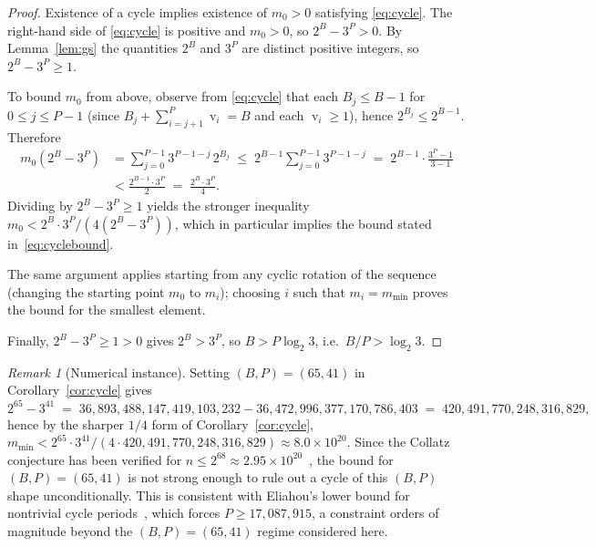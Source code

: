 \documentclass[11pt,a4paper]{article}
\theoremstyle{definition}
\theoremstyle{remark}
\newtheorem{remark}[theorem]{Remark}
\DeclareMathOperator{\val}{v}
\begin{document}
\begin{proof}
Existence of a cycle implies existence of $m_0 > 0$ satisfying
\eqref{eq:cycle}.  The right-hand side of \eqref{eq:cycle} is positive
and $m_0 > 0$, so $2^B - 3^P > 0$.  By Lemma~\ref{lem:gs} the
quantities $2^B$ and $3^P$ are distinct positive integers, so
$2^B - 3^P \geq 1$.

To bound $m_0$ from above, observe from \eqref{eq:cycle} that
each $B_j \leq B - 1$ for $0 \leq j \leq P - 1$ (since
$B_j + \sum_{i=j+1}^{P} \val_i = B$ and each $\val_i \geq 1$), hence
$2^{B_j} \leq 2^{B-1}$.  Therefore
\begin{align*}
  m_0 (2^B - 3^P)
  &= \sum_{j=0}^{P-1} 3^{P-1-j} \, 2^{B_j}
  \;\leq\; 2^{B-1} \sum_{j=0}^{P-1} 3^{P-1-j}
  \;=\; 2^{B-1} \cdot \frac{3^P - 1}{3 - 1} \\
  &< \frac{2^{B-1} \cdot 3^P}{2}
   \;=\; \frac{2^B \cdot 3^P}{4}.
\end{align*}
Dividing by $2^B - 3^P \geq 1$ yields the stronger inequality
$m_0 < 2^B \cdot 3^P / (4(2^B - 3^P))$, which in particular implies
the bound stated in~\eqref{eq:cyclebound}.

The same argument applies starting from any cyclic rotation of the
sequence (changing the starting point $m_0$ to $m_i$); choosing
$i$ such that $m_i = m_{\min}$ proves the bound for the smallest
element.

Finally, $2^B - 3^P \geq 1 > 0$ gives $2^B > 3^P$, so
$B > P \log_2 3$, i.e.\ $B/P > \log_2 3$.
\end{proof}

\begin{remark}[Numerical instance]\label{rem:cyclenum}
Setting $(B, P) = (65, 41)$ in Corollary~\ref{cor:cycle} gives
\[
  2^{65} - 3^{41}
  \;=\; 36{,}893{,}488{,}147{,}419{,}103{,}232
      - 36{,}472{,}996{,}377{,}170{,}786{,}403
  \;=\; 420{,}491{,}770{,}248{,}316{,}829,
\]
hence by the sharper $1/4$ form of Corollary~\ref{cor:cycle},
$m_{\min} < 2^{65} \cdot 3^{41} /
(4 \cdot 420{,}491{,}770{,}248{,}316{,}829) \approx
8.0 \times 10^{20}$.  Since the Collatz conjecture has been verified
for $n \leq 2^{68} \approx 2.95 \times 10^{20}$~\cite{BarinaCheckup},
the bound for $(B, P) = (65, 41)$ is not strong
enough to rule out a cycle of this $(B, P)$ shape unconditionally.
This is consistent with Eliahou's lower bound for nontrivial cycle
periods~\cite{Eliahou1993}, which forces $P \geq 17{,}087{,}915$, a
constraint orders of magnitude beyond the $(B, P) = (65, 41)$ regime
considered here.
\end{remark}
\end{document}
